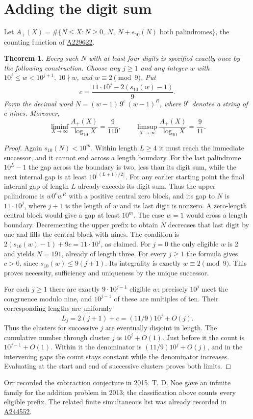 \documentclass[11pt,letterpaper]{article}
\newtheorem{theorem}{Theorem}
\newcommand{\oeis}[1]{\href{https://oeis.org/A#1}{A#1}}
\begin{document}
\section{Adding the digit sum}
Let \(A_+(X)=\#\{N\le X:N\ge0,\ N,\ N+s_{10}(N)\text{ both palindromes}\}\), the counting function of \oeis{229622}.
\begin{theorem}
Every such \(N\) with at least four digits is specified exactly once by the following construction. Choose any \(j\ge1\) and any integer \(w\) with \(10^j\le w<10^{j+1}\), \(10\nmid w\), and \(w\equiv2\pmod9\). Put
\[
 c=\frac{11\cdot10^j-2(s_{10}(w)-1)}9.
\]
Form the decimal word \(N=(w-1)\,9^c\,(w-1)^R\), where \(9^c\) denotes a string of \(c\) nines. Moreover,
\[
 \liminf_{X\to\infty}\frac{A_+(X)}{\log_{10}X}=\frac9{110},\qquad
 \limsup_{X\to\infty}\frac{A_+(X)}{\log_{10}X}=\frac9{11}.
\]
\end{theorem}
\begin{proof}
Again \(s_{10}(N)<10^m\). Within length \(L\ge4\) it must reach the immediate successor, and it cannot end across a length boundary. For the last palindrome \(10^L-1\) the gap across the boundary is two, less than its digit sum, while the next internal gap is at least \(10^{\lfloor(L+1)/2\rfloor}\). For any earlier starting point the final internal gap of length \(L\) already exceeds its digit sum. Thus the upper palindrome is \(w0^c w^R\) with a positive central zero block, and its gap to \(N\) is \(11\cdot10^j\), where \(j+1\) is the length of \(w\) and its last digit is nonzero. A zero-length central block would give a gap at least \(10^m\). The case \(w=1\) would cross a length boundary. Decrementing the upper prefix to obtain \(N\) decreases that last digit by one and fills the central block with nines. The condition is \(2(s_{10}(w)-1)+9c=11\cdot10^j\), as claimed. For \(j=0\) the only eligible \(w\) is 2 and yields \(N=191\), already of length three. For every \(j\ge1\) the formula gives \(c>0\), since \(s_{10}(w)\le9(j+1)\). Its integrality is exactly \(w\equiv2\pmod9\). This proves necessity, sufficiency and uniqueness by the unique successor.

For each \(j\ge1\) there are exactly \(9\cdot10^{j-1}\) eligible \(w\): precisely \(10^j\) meet the congruence modulo nine, and \(10^{j-1}\) of these are multiples of ten. Their corresponding lengths are uniformly
\[
 L_j=2(j+1)+c=(11/9)10^j+O(j).
\]
Thus the clusters for successive \(j\) are eventually disjoint in length. The cumulative number through cluster \(j\) is \(10^j+O(1)\). Just before it the count is \(10^{j-1}+O(1)\). Within it the denominator is \((11/9)10^j+O(j)\), and in the intervening gaps the count stays constant while the denominator increases. Evaluating at the start and end of successive clusters proves both limits.
\end{proof}

Orr recorded the subtraction conjecture in 2015. T. D. Noe gave an infinite family for the addition problem in 2013; the classification above counts every eligible prefix. The related finite simultaneous list was already recorded in \oeis{244552}.
\end{document}
